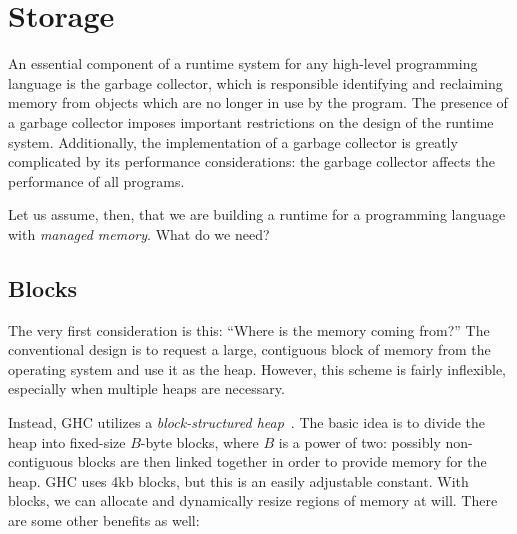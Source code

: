 \section{Storage}

An essential component of a runtime system for any high-level
programming language is the garbage collector, which is responsible
identifying and reclaiming memory from objects which are no longer in
use by the program.
The presence of a garbage collector imposes important restrictions on
the design of the runtime system.  Additionally, the implementation of a
garbage collector is greatly complicated by its performance
considerations: the garbage collector affects the performance of all
programs.

Let us assume, then, that we are building a runtime for a programming
language with \emph{managed memory}.  What do we need?

\subsection{Blocks}

The very first consideration is this: ``Where is the memory coming
from?''  The conventional design is to request a large, contiguous block
of memory from the operating system and use it as the heap.  However,
this scheme is fairly inflexible, especially when multiple heaps are
necessary.

Instead, GHC utilizes a \emph{block-structured heap}~\cite{Marlow:2008:PGG:1375634.1375637}.
The basic idea is to divide the heap into fixed-size $B$-byte blocks,
where $B$ is a power of two: possibly non-contiguous blocks are then linked together in order to
provide memory for the heap.  GHC uses 4kb blocks, but this is an easily
adjustable constant.  With blocks, we can allocate and dynamically
resize regions of memory at will.  There are some other benefits as well:

